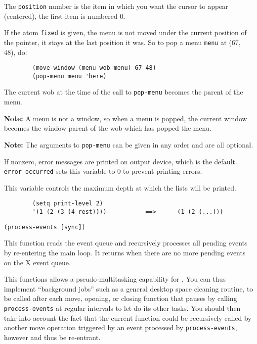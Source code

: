 The \verb"position" number is the item in which you want the cursor to appear
(centered), the first item is numbered 0.

If the atom \verb"fixed" is given, the menu is not moved under the current
position of the pointer, it stays at the last position it was. So to pop a
menu \verb"menu" at (67, 48), do:

{\exemplefont\begin{verbatim}
        (move-window (menu-wob menu) 67 48)
        (pop-menu menu 'here)
\end{verbatim}}

The current wob at the time of the call to \verb"pop-menu" becomes the
parent of the menu.

{\bf Note:} A menu is not a {\GWM} window, so when a menu is popped, 
the current
window becomes the window parent of the wob which has popped the menu.

{\bf Note:} The arguments to \verb"pop-menu" can be given in any order and
are all optional.



If nonzero, {\WOOL} error messages are printed on {\GWM} output device,
which is the default. \verb"error-occurred" sets this variable to 0 to
prevent printing errors.



This variable controls the maximum depth at which the lists will be printed.

{\exemplefont\begin{verbatim}
        (setq print-level 2)
        '(1 (2 (3 (4 rest))))           ==>      (1 (2 (...)))
\end{verbatim}}



{\usagefont\begin{verbatim}
(process-events [sync])
\end{verbatim}}\usageupspace

This function reads the event queue and recursively processes all pending
events by re-entering the main {\GWM} loop. It returns when there are no
more pending events on the X event queue.

This functions allows a pseudo-multitasking capability for {\GWM}.
You can thus implement ``background jobs'' such as a general desktop space
cleaning routine, to be called after each move, opening, or closing function
that pauses by calling \verb"process-events" at regular intervals to let
{\GWM} do its other tasks. You should then take into account the fact that
the current function could be recursively called by another move operation
triggered by an event processed by \verb"process-events", however and thus
be re-entrant.

